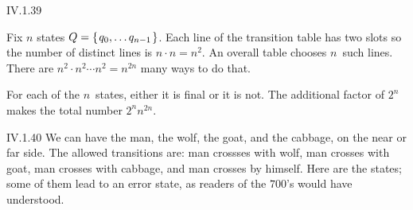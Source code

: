 \begin{ans}{IV.1.39}
\begin{exparts}
\item
Fix $n$ states $Q=\set{q_0,\ldots q_{n-1}}$.
Each line of the transition table has two slots so the number of
distinct lines is $n\cdot n=n^2$.
An overall table chooses $n$~such lines.
There are $n^2\cdot n^2 \cdots n^2=n^{2n}$ many ways to do that.

\item
For each of the $n$~states, either it is final or it is not.
The additional factor of $2^n$ makes the total number
$2^nn^{2n}$.
\end{exparts}
\end{ans}
%
\begin{ans}{IV.1.40}
We can have the man, the wolf, the goat, and the cabbage,
on the near or far side.
The allowed transitions are: man crossses with wolf,
man crosses with goat, man crosses with cabbage, and man crosses by himself.
Here are the states; some of them lead to an error state, as readers of the
$700$'s would have understood.


\end{ans}
